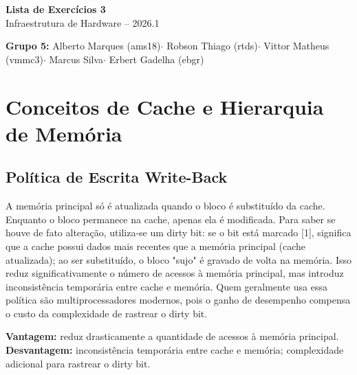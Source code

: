 \documentclass[12pt, a4paper]{article}
\begin{document}
\begin{center}
  {\LARGE\bfseries\color{cinufpe} Lista de Exercícios 3}\\[6pt]
  {\large Infraestrutura de Hardware -- 2026.1}\\[4pt]
\end{center}
\vspace{0.2cm}

\begin{center}
  \small
  \textbf{Grupo 5:}\quad
  Alberto Marques (ams18)\enspace$\cdot$\enspace
  Robson Thiago (rtds)\enspace$\cdot$\enspace
  Vittor Matheus (vmmc3)\enspace$\cdot$\enspace
  Marcus Silva\enspace$\cdot$\enspace
  Erbert Gadelha (ebgr)
\end{center}
\vspace{0.3cm}

\section{Conceitos de Cache e Hierarquia de Memória}

\subsection{Política de Escrita Write-Back}

A memória principal só é atualizada quando o bloco é substituído da cache. Enquanto o bloco permanece na cache, apenas ela é modificada. Para saber se houve de fato alteração, utiliza-se um dirty bit: se o bit está marcado [1], significa que a cache possui dados mais recentes que a memória principal (cache atualizada); ao ser substituído, o bloco "sujo" é gravado de volta na memória. Isso reduz significativamente o número de acessos à memória principal, mas introduz inconsistência temporária entre cache e memória. Quem geralmente usa essa política são multiprocessadores modernos, pois o ganho de desempenho compensa o custo da complexidade de rastrear o dirty bit.

\begin{caixaamarela}
  \textbf{Vantagem:} reduz drasticamente a quantidade de acessos à memória principal.\\
  \textbf{Desvantagem:} inconsistência temporária entre cache e memória;
  complexidade adicional para rastrear o dirty bit.
\end{caixaamarela}
\end{document}
